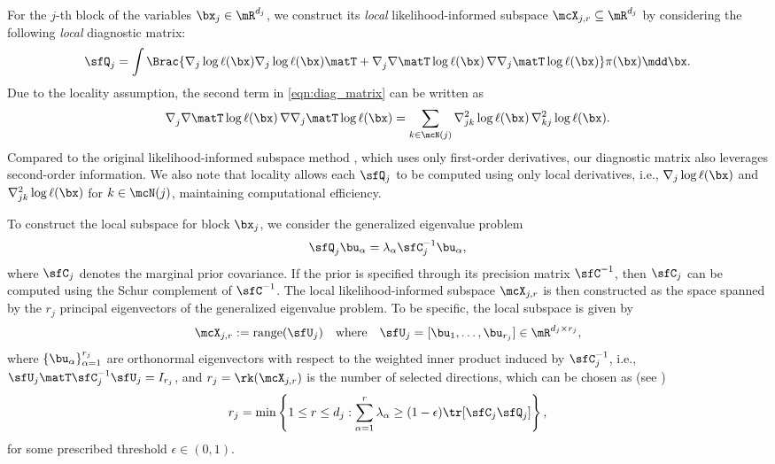 \documentclass[11pt]{article}
\begin{document}
For the $j$-th block of the variables $\bx_j \in \mR^{d_j}$, we construct its \emph{local} likelihood-informed subspace $\mcX_{j,r} \subseteq \mR^{d_j}$ by considering the following \emph{local} diagnostic matrix:
\begin{equation}
\label{eqn:diag_matrix}
    \sfQ_j = \int \Brac{ \nabla_j \log \ell(\bx) \nabla_j \log \ell(\bx) \matT + \nabla_j^{} \nabla\matT \log \ell(\bx)\, \nabla \nabla_j\matT \log \ell(\bx) } \pi(\bx) \mdd \bx.
\end{equation}
Due to the locality assumption, the second term in \eqref{eqn:diag_matrix} can be written as
\begin{equation}
    \nabla_j^{} \nabla\matT \log \ell(\bx)\, \nabla \nabla_j\matT \log \ell(\bx) = \sum_{k\in \mcN(j)} \nabla_{jk}^2 \log \ell(\bx)\, \nabla_{kj}^2 \log \ell(\bx).
\end{equation}
Compared to the original likelihood-informed subspace method \cite{MR3274599}, which uses only first-order derivatives, our diagnostic matrix also leverages second-order information.
%
We also note that locality allows each $\sfQ_j$ to be computed using only local derivatives, i.e., $\nabla_j \log \ell(\bx)$ and $\nabla_{jk}^2 \log \ell(\bx)$ for $k\in\mcN(j)$, maintaining computational efficiency.



To construct the local subspace for block $\bx_j$, we consider the generalized eigenvalue problem
\begin{equation}
\label{eqn:local_gep}
    \sfQ_j^{} \bu_{\alpha} = \lambda_\alpha \sfC_j^{-1} \bu_\alpha,
\end{equation}
where $\sfC_j$ denotes the marginal prior covariance. If the prior is specified through its precision matrix $\sfC^{-1}$, then $\sfC_j$ can be computed using the Schur complement of $\sfC^{-1}$.
%
The local likelihood-informed subspace $\mcX_{j,r}$ is then constructed as the space spanned by the $r_j$ principal eigenvectors of the generalized eigenvalue problem.
%
To be specific, the local subspace is given by 
\begin{equation}
\label{eqn:local_LIS}
    \mcX_{j,r} := \text{range}(\sfU_j) \quad \text{where} \quad \sfU_j = [\bu_1,\dots, \bu_{r_j}] \in \mR^{d_j \times r_j},
\end{equation}
where $\{\bu_\alpha\}_{\alpha=1}^{r_j}$ are orthonormal eigenvectors with respect to the weighted inner product induced by $\sfC_j^{-1}$, i.e., $\sfU_j\matT \sfC_j^{-1} \sfU_j = I_{r_j}$, and $r_j = \rk (\mcX_{j,r}) $ is the number of selected directions, which can be chosen as (see \cite{MR4474562})
\begin{equation}
    r_j = \min \left\{1\le r \le d_j : \sum_{\alpha=1}^r \lambda_\alpha \ge (1-\epsilon) \tr [ \sfC_j \sfQ_j ] \right\},
\end{equation}
for some prescribed threshold $\epsilon \in (0,1)$.
\end{document}
